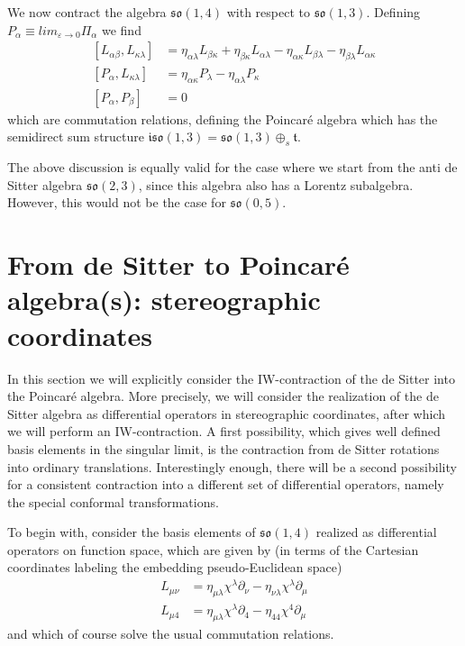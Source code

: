 \documentclass[10pt]{article}
\newcommand{\mfrak}{\mathfrak}
\newcommand{\pd}{\partial}
\newcommand{\blankline}{\vspace{\baselineskip}}
\begin{document}
We now contract the algebra $\mfrak{so}(1,4)$ with respect to $\mfrak{so}(1,3)$.  
Defining $P_\alpha \equiv lim_{\varepsilon\rightarrow 0} \Pi_\alpha$ we find
\begin{equation}\label{eq:CommRel_P}
  \begin{split}
    [L_{\alpha\beta},L_{\kappa\lambda}] &= \eta_{\alpha\lambda}L_{\beta\kappa} + 
    \eta_{\beta\kappa}L_{\alpha\lambda} - \eta_{\alpha\kappa}L_{\beta\lambda} - 
    \eta_{\beta\lambda}L_{\alpha\kappa} \\
    [P_{\alpha},L_{\kappa\lambda}] &= \eta_{\alpha\kappa}P_\lambda - 
    \eta_{\alpha\lambda}P_\kappa \\
    [P_\alpha,P_\beta] &= 0
  \end{split}
\end{equation}
which are commutation relations, defining the Poincar\'e algebra which has the 
semidirect sum structure $\mfrak{iso}(1,3)=\mfrak{so}(1,3)\oplus_s\mfrak{t}$.
\blankline

The above discussion is equally valid for the case where we start from the anti 
de Sitter algebra $\mfrak{so}(2,3)$, since this algebra also has a Lorentz 
subalgebra. However, this would not be the case for $\mfrak{so}(0,5)$.

\section{From de Sitter to Poincar\'e algebra(s): stereographic coordinates}

In this section we will explicitly consider the IW-contraction of the de Sitter 
into the Poincar\'e algebra. More precisely, we will consider the realization of 
the de Sitter algebra as differential operators in stereographic coordinates, 
after which we will perform an IW-contraction. A first possibility, which gives 
well defined basis elements in the singular limit, is the contraction from de 
Sitter rotations into ordinary translations. Interestingly enough, there will be 
a second possibility for a consistent contraction into a different set of 
differential operators, namely the special conformal transformations.
\blankline

To begin with, consider the basis elements of $\mfrak{so}(1,4)$ realized as 
differential operators on function space, which are given by (in terms of the 
Cartesian coordinates labeling the embedding pseudo-Euclidean space)
\begin{align}
  L_{\mu\nu} &= \eta_{\mu\lambda} \chi^\lambda \pd_\nu - \eta_{\nu\lambda} 
  \chi^{\lambda} \pd_\mu \label{eq:gen_cart1} \\
  L_{\mu 4} &= \eta_{\mu\lambda} \chi^\lambda \pd_4-\eta_{44}\chi^4 \pd_\mu 
  \label{eq:gen_cart2}
\end{align}
and which of course solve the usual commutation relations.
\end{document}
